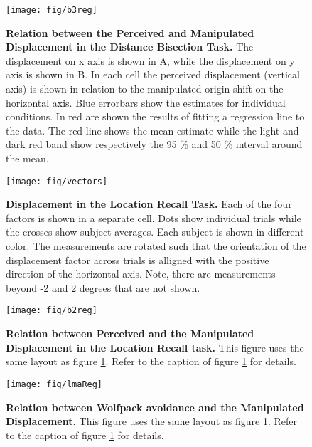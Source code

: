 \documentclass[10pt]{article}
\begin{document}
\begin{figure}[!ht]
\begin{center}
\texttt{[image: fig/b3reg]}
\end{center}
\caption{
{\bf Relation between the Perceived and Manipulated Displacement in the Distance Bisection Task.} The displacement on x axis is shown in A, while the displacement on y axis is shown in B. In each cell the perceived displacement (vertical axis) is shown in relation to the manipulated origin shift on the horizontal axis.  
Blue errorbars show the estimates for individual conditions. In red are shown the results of fitting a regression line to the data. The red line shows the mean estimate while the light and dark red band show respectively the 95 \% and 50 \% interval around the mean. }
\label{fig:b3reg}
\end{figure}

\begin{figure}[!ht]
\begin{center}
\texttt{[image: fig/vectors]}
\end{center}
\caption{
{\bf Displacement in the Location Recall Task.}
Each of the four factors is shown in a separate cell. Dots show individual trials while the crosses show subject averages. Each subject is shown in different color. The measurements are rotated such that the orientation of the displacement factor across trials is alligned with the positive direction of the horizontal axis. Note, there are measurements beyond -2 and 2 degrees that are not shown.
}\label{fig:vec}
\end{figure}

\begin{figure}[!ht]
\begin{center}
\texttt{[image: fig/b2reg]}
\end{center}
\caption{
{\bf Relation between Perceived and the Manipulated Displacement in the Location Recall task.}
This figure uses the same layout as figure \ref{fig:b3reg}. Refer to the caption of figure \ref{fig:b3reg} for details.
}\label{fig:b2reg}
\end{figure}

\begin{figure}[!ht]
\begin{center}
\texttt{[image: fig/lmaReg]}
\end{center}
\caption{
{\bf Relation between Wolfpack avoidance and the Manipulated Displacement.}
This figure uses the same layout as figure \ref{fig:b3reg}. Refer to the caption of figure \ref{fig:b3reg} for details.
}\label{fig:lmaReg}
\end{figure}
\end{document}
